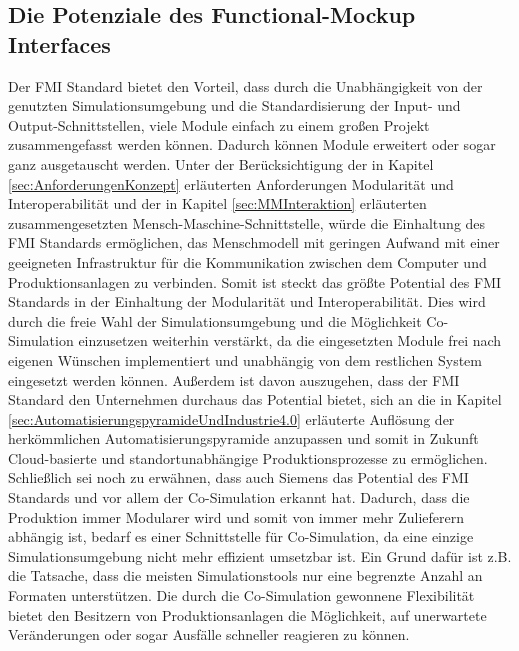\subsection{Die Potenziale des Functional-Mockup Interfaces}\label{sec:PotenzialeFMU}
Der FMI Standard bietet den Vorteil, dass durch die Unabhängigkeit von der genutzten Simulationsumgebung und die Standardisierung der Input- und Output-Schnittstellen, viele Module einfach zu einem großen Projekt zusammengefasst werden können. Dadurch können Module erweitert oder sogar ganz ausgetauscht werden.
Unter der Berücksichtigung der in Kapitel \ref{sec:AnforderungenKonzept} erläuterten Anforderungen Modularität und Interoperabilität und der in Kapitel \ref{sec:MMInteraktion} erläuterten zusammengesetzten Mensch-Maschine-Schnittstelle, würde die Einhaltung des FMI Standards ermöglichen, das Menschmodell mit geringen Aufwand mit einer geeigneten Infrastruktur für die Kommunikation zwischen dem Computer und Produktionsanlagen zu verbinden.
\newline
Somit ist steckt das größte Potential des FMI Standards in der Einhaltung der Modularität und Interoperabilität. Dies wird durch die freie Wahl der Simulationsumgebung und die Möglichkeit Co-Simulation einzusetzen weiterhin verstärkt, da die eingesetzten Module frei nach eigenen Wünschen implementiert und unabhängig von dem restlichen System eingesetzt werden können. Außerdem ist davon auszugehen, dass der FMI Standard den Unternehmen durchaus das Potential bietet, sich an die in Kapitel \ref{sec:AutomatisierungspyramideUndIndustrie4.0} erläuterte Auflösung der herkömmlichen Automatisierungspyramide anzupassen und somit in Zukunft Cloud-basierte und standortunabhängige Produktionsprozesse zu ermöglichen.
\newline
Schließlich sei noch zu erwähnen, dass auch Siemens das Potential des FMI Standards und vor allem der Co-Simulation erkannt hat. Dadurch, dass die Produktion immer Modularer wird und somit von immer mehr Zulieferern abhängig ist, bedarf es einer Schnittstelle für Co-Simulation, da eine einzige Simulationsumgebung nicht mehr effizient umsetzbar ist. Ein Grund dafür ist z.B. die Tatsache, dass die meisten Simulationstools nur eine begrenzte Anzahl an Formaten unterstützen. Die durch die Co-Simulation gewonnene Flexibilität bietet den Besitzern von Produktionsanlagen die Möglichkeit, auf unerwartete Veränderungen oder sogar Ausfälle schneller reagieren zu können\cite[S.13]{27}. 

